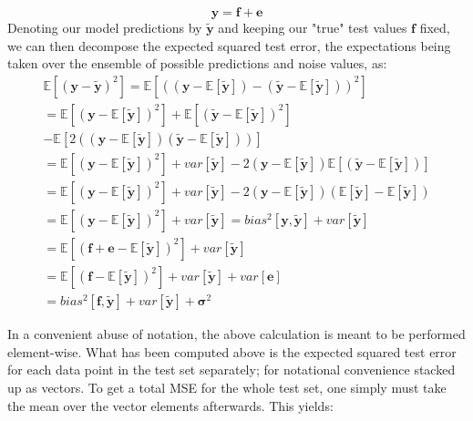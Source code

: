 \documentclass[reprint, english, nofootinbib]{revtex4-2}
\begin{document}
        \begin{equation}
        \label{model_assumption}
        \pmb{y} = \pmb{f} + \pmb{e}
        \end{equation}
            Denoting our model predictions by $\pmb{\tilde{y}}$ and keeping our "true" test values $\pmb{f}$ fixed,  we can then decompose the expected squared test error, the expectations being taken over the ensemble of possible predictions and noise values, as:
        \begin{equation}
        \label{bias_variance_decomp}
        \begin{split}
        \mathbb{E} [(\pmb{y} - \pmb{\tilde{y}})^2] = \mathbb{E} [((\pmb{y} - \mathbb{E}[\pmb{\tilde{y}}]) - (\pmb{\tilde{y}} - \mathbb{E}[\pmb{\tilde{y}}]))^2] \\
        = \mathbb{E}[(\pmb{y} - \mathbb{E}[\pmb{\tilde{y}}])^2] + \mathbb{E}[(\pmb{\tilde{y}} - \mathbb{E}[\pmb{\tilde{y}}])^2] \\
        - \mathbb{E} [ 2 ( (\pmb{y} - \mathbb{E}[\pmb{\tilde{y}}])(\pmb{\tilde{y}} - \mathbb{E}[\pmb{\tilde{y}}]))] \\
        = \mathbb{E}[(\pmb{y} - \mathbb{E}[\pmb{\tilde{y}}])^2] + var[\pmb{\tilde{y}}] - 2(\pmb{y} - \mathbb{E}[\pmb{\tilde{y}}])\mathbb{E}[(\pmb{\tilde{y}} - \mathbb{E}[\pmb{\tilde{y}}])] \\
        = \mathbb{E}[(\pmb{y} - \mathbb{E}[\pmb{\tilde{y}}])^2] + var[\pmb{\tilde{y}}] - 2(\pmb{y} - \mathbb{E}[\pmb{\tilde{y}}])(\mathbb{E}[\pmb{\tilde{y}}] - \mathbb{E}[\pmb{\tilde{y}}]) \\
        = \mathbb{E}[(\pmb{y} - \mathbb{E}[\pmb{\tilde{y}}])^2] + var[\pmb{\tilde{y}}] = bias^2[\pmb{y},\pmb{\tilde{y}}] + var[\pmb{\tilde{y}}] \\
        = \mathbb{E}[(\pmb{f} + \pmb{e} - \mathbb{E}[\pmb{\tilde{y}}])^2] + var[\pmb{\tilde{y}}] \\ = \mathbb{E}[(\pmb{f} - \mathbb{E}[\pmb{\tilde{y}}])^2] + var[\pmb{\tilde{y}}] + var[\pmb{e}] \\
        = bias^2[\pmb{f},\pmb{\tilde{y}}] + var[\pmb{\tilde{y}}] + \pmb{\sigma}^2
        \end{split}
        \end{equation}

        In a convenient abuse of notation, the above calculation is meant to be performed element-wise. What has been computed above is the expected squared test error for each data point in the test set separately; for notational convenience stacked up as vectors. To get a total MSE for the whole test set, one simply must take the mean over the vector elements afterwards. This yields:
\end{document}
